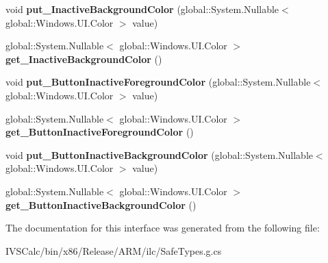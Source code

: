 \begin{DoxyCompactItemize}
\item 
\mbox{\label{interface_windows_1_1_u_i_1_1_view_management_1_1_i_application_view_title_bar_a0dc3b1444aee9f60ba18f4386ecc30d0}} 
void {\bfseries put\+\_\+\+Inactive\+Background\+Color} (global\+::\+System.\+Nullable$<$ global\+::\+Windows.\+U\+I.\+Color $>$ value)
\item 
\mbox{\label{interface_windows_1_1_u_i_1_1_view_management_1_1_i_application_view_title_bar_ae1fcd0fba7ae4af9e451a55a07e94dd4}} 
global\+::\+System.\+Nullable$<$ global\+::\+Windows.\+U\+I.\+Color $>$ {\bfseries get\+\_\+\+Inactive\+Background\+Color} ()
\item 
\mbox{\label{interface_windows_1_1_u_i_1_1_view_management_1_1_i_application_view_title_bar_a7e5de3d71b2c3eaa81547caf852dcda9}} 
void {\bfseries put\+\_\+\+Button\+Inactive\+Foreground\+Color} (global\+::\+System.\+Nullable$<$ global\+::\+Windows.\+U\+I.\+Color $>$ value)
\item 
\mbox{\label{interface_windows_1_1_u_i_1_1_view_management_1_1_i_application_view_title_bar_a6b7b15cd7a0d077ceb8c1fdd9f3890ec}} 
global\+::\+System.\+Nullable$<$ global\+::\+Windows.\+U\+I.\+Color $>$ {\bfseries get\+\_\+\+Button\+Inactive\+Foreground\+Color} ()
\item 
\mbox{\label{interface_windows_1_1_u_i_1_1_view_management_1_1_i_application_view_title_bar_a515c5ceabfbfef584b473d37a4db41b0}} 
void {\bfseries put\+\_\+\+Button\+Inactive\+Background\+Color} (global\+::\+System.\+Nullable$<$ global\+::\+Windows.\+U\+I.\+Color $>$ value)
\item 
\mbox{\label{interface_windows_1_1_u_i_1_1_view_management_1_1_i_application_view_title_bar_a6c110cc1abc214ae3ab4e3fad20dbd79}} 
global\+::\+System.\+Nullable$<$ global\+::\+Windows.\+U\+I.\+Color $>$ {\bfseries get\+\_\+\+Button\+Inactive\+Background\+Color} ()
\end{DoxyCompactItemize}


The documentation for this interface was generated from the following file\+:\begin{DoxyCompactItemize}
\item 
I\+V\+S\+Calc/bin/x86/\+Release/\+A\+R\+M/ilc/Safe\+Types.\+g.\+cs\end{DoxyCompactItemize}
